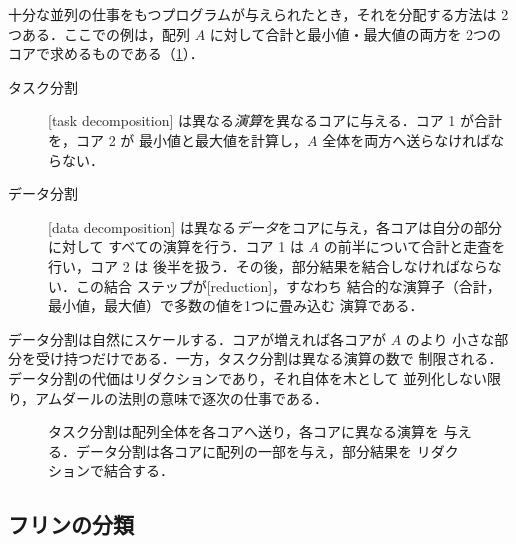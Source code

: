 \documentclass[../main.tex]{subfiles}
\begin{document}
十分な並列の仕事をもつプログラムが与えられたとき，それを分配する方法は
2つある．ここでの例は，配列 $A$ に対して合計と最小値・最大値の両方を
2つのコアで求めるものである（\cref{fig:l01-decomposition}）．
\begin{description}
  \item[タスク分割] [task decomposition]
    は異なる\emph{演算}を異なるコアに与える．コア 1 が合計を，コア 2 が
    最小値と最大値を計算し，$A$ 全体を両方へ送らなければならない．
  \item[データ分割] [data decomposition]
    は異なる\emph{データ}をコアに与え，各コアは自分の部分に対して
    すべての演算を行う．コア 1 は $A$ の前半について合計と走査を行い，コア 2 は
    後半を扱う．その後，部分結果を結合しなければならない．この結合
    ステップが[reduction]，すなわち
    結合的な演算子（合計，最小値，最大値）で多数の値を1つに畳み込む
    演算である．
\end{description}
データ分割は自然にスケールする．コアが増えれば各コアが $A$ のより
小さな部分を受け持つだけである．一方，タスク分割は異なる演算の数で
制限される．データ分割の代価はリダクションであり，それ自体を木として
並列化しない限り，アムダールの法則の意味で逐次の仕事である．

\begin{figure}[tb]  %
  \centering
  
  \caption{タスク分割は配列全体を各コアへ送り，各コアに異なる演算を
    与える．データ分割は各コアに配列の一部を与え，部分結果を
    リダクションで結合する．}
  \label{fig:l01-decomposition}
\end{figure}

\subsection{フリンの分類}

\begin{marginfigure}
  \resizebox{\linewidth}{!}{}
  \caption{フリンの分類．GPU は単一命令・複数データの象限に SIMT
    として位置する．}
  \label{fig:l01-flynn}
\end{marginfigure}
\end{document}
